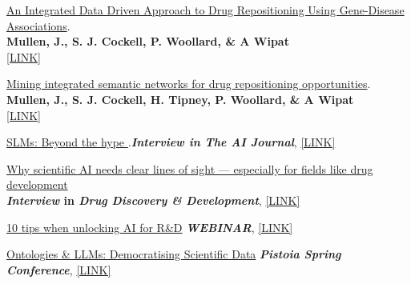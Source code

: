 \documentclass[print]{cv-style}          %
\begin{document}
\underline{An Integrated Data Driven Approach to Drug Repositioning Using Gene-Disease Associations}.\\ 
    \textbf{Mullen, J., S. J. Cockell, P. Woollard, \& A Wipat}\\
    {} \href{https://journals.plos.org/plosone/article?id=10.1371/journal.pone.0155811}{[LINK]}

\underline{Mining integrated semantic networks for drug repositioning opportunities}.\\ 
    \textbf{Mullen, J., S. J. Cockell, H. Tipney, P. Woollard, \& A Wipat}\\
    {} \href{https://peerj.com/articles/1558/}{[LINK]}


\underline{SLMs: Beyond the hype }.\textbf{\textit{Interview in The AI Journal}}, {} \href{https://aijourn.com/slms-beyond-the-hype/}{[LINK]}

\underline{Why scientific AI needs clear lines of sight — especially for fields like drug development} \\\textbf{\textit{Interview} in \textit{Drug Discovery \& Development}}, {} \href{https://www.drugdiscoverytrends.com/why-scientific-ai-needs-clear-lines-of-sight-especially-for-fields-like-drug-development/}{[LINK]}


\underline{10 tips when unlocking AI for R\&D} \textbf{\textit{WEBINAR}}, {} \href{https://www.elsevier.com/en-gb/connect/10-tips-when-unlocking-ai-for-r-and-d}{[LINK]}

\underline{Ontologies \& LLMs: Democratising Scientific Data} \textbf{\textit{Pistoia Spring Conference}}, {} \href{https://marketing.pistoiaalliance.org/hubfs/2024%20Spring%20Conference%20Presentations/Joe%20Mullen.pdf}{[LINK]}
\end{document}
